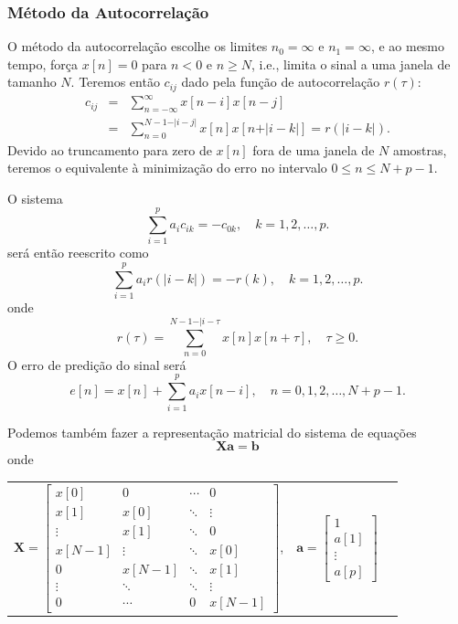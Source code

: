 \begin{frame}[allowframebreaks]
  \frametitle{Método da Autocorrelação}
  O método da autocorrelação escolhe os limites $n_0=\infty$ e $n_1=\infty$, e ao mesmo tempo,
  força $x[n]=0$ para $n<0$ e $n\geq N$, i.e., limita o sinal a uma janela de tamanho $N$.
  Teremos então $c_{ij}$ dado pela função de autocorrelação $r(\tau)$:
  \begin{eqnarray}
  c_{ij} &=& \sum_{n=-\infty}^{\infty} x[n-i] x[n-j] \nonumber \\
         &=& \sum_{n=0}^{N-1-\vert i-j \vert} x[n] x[n+\vert i-k \vert] = r(\vert i-k \vert) .
  \end{eqnarray}
  Devido ao truncamento para zero de $x[n]$ fora de uma janela de $N$ amostras, teremos o equivalente
  à minimização do erro no intervalo $0 \leq n \leq N+p-1$.

  O sistema 
  \begin{equation}
  \sum_{i=1}^p a_i c_{ik} = - c_{0k} , \quad k=1,2,\ldots,p .
  \end{equation}
  será então reescrito como
  \begin{equation}
  \sum_{i=1}^p a_i r(\vert i-k \vert) = - r(k) , \quad k=1,2,\ldots,p .
  \end{equation}
  onde
  \begin{equation}
  r(\tau) = \sum_{n=0}^{N-1-\vert i-\tau}x[n] x[n+\tau] , \quad \tau \geq 0 .
  \end{equation}
  O erro de predição do sinal será
  \begin{equation}
  e[n] = x[n] + \sum_{i=1}^p a_i x[n-i] , \quad n=0,1,2,\ldots,N+p-1 .
  \end{equation}

  \framebreak
  Podemos também fazer a representação matricial do sistema de equações
  \begin{equation}
  \mathbf{X} \mathbf{a} = \mathbf{b}
  \end{equation}
  onde
  \begin{scriptsize}
  \begin{tabular}{ccc}
  $
  \mathbf{X} = 
  \left[ \begin{array}{cccc}
  x[0]   & 0      & \cdots & 0 \\
  x[1]   & x[0]   & \ddots & \vdots \\
  \vdots & x[1]   & \ddots & 0 \\
  x[N-1] & \vdots   & \ddots & x[0] \\
  0      & x[N-1]   & \ddots & x[1] \\
  \vdots & \ddots & \ddots & \vdots \\
  0      & \cdots &  0     & x[N-1]
  \end{array} \right] $,
  &
  $\mathbf{a} = \left[ \begin{array}{c}
  1 \\
  a[1] \\
  \vdots \\
  a[p] \end{array} \right] $


\end{tabular}
\end{scriptsize}
\end{frame}
